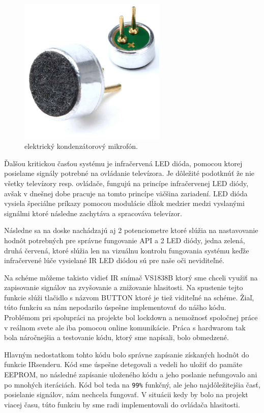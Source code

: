 \begin{figure}[!tbh]
\centering
\includegraphics[width=7cm]{obr/mike.jpg}
\caption{{elektrický kondenzátorový mikrofón.\cite{mike}}}\label{OBRAZOK 1.3}
\end{figure}

Ďalšou kritickou časťou systému je infračervená LED dióda, pomocou ktorej posielame signály potrebné na ovládanie televízora. Je dôležité podotknúť že nie všetky televízory resp. ovládače, fungujú na princípe infračervenej LED diódy, avšak v dnešnej dobe pracuje na tomto princípe väčšina zariadení. LED dióda vysiela špeciálne príkazy pomocou modulácie dĺžok medzier medzi vyslanými signálmi ktoré následne zachytáva a spracováva televízor.

Následne sa na doske nachádzajú aj 2 potenciometre ktoré slúžia na nastavovanie hodnôt potrebných pre správne fungovanie API a 2 LED diódy, jedna zelená, druhá červená, ktoré slúžia len na vizuálnu kontrolu fungovania systému keďže infračervené lúče vysielané IR LED diódou sú pre naše oči neviditeľné.

Na schéme môžeme takisto vidieť IR snímač VS1838B ktorý sme chceli využiť na zapisovanie signálov na zvyšovanie a znižovanie hlasitosti. Na spustenie tejto funkcie slúži tlačidlo s názvom BUTTON ktoré je tiež viditeľné na schéme. Žiaľ, túto funkciu sa nám nepodarilo úspešne implementovať do nášho kódu. Problémom pri spolupráci na projekte bol lockdown a nemožnosť spoločnej práce v reálnom svete ale iba pomocou online komunikácie. Práca s hardwarom tak bola náročnejšia a testovanie kódu, ktorý sme napísali, bolo obmedzené.

Hlavným nedostatkom tohto kódu bolo správne zapísanie získaných hodnôt do funkcie IRsenderu. Kód sme úspešne detegovali a vedeli ho uložiť do pamäte EEPROM, no následné zapísanie uloženého kódu a jeho poslanie nefungovalo ani po mnohých iteráciách. Kód bol teda na \verb|99%| funkčný, ale jeho najdôležitejšia časť, posielanie signálov, nám nechcela fungovať. V situácii kedy by bolo na projekt viacej času, túto funkciu by sme radi implementovali do ovládača hlasitosti.





